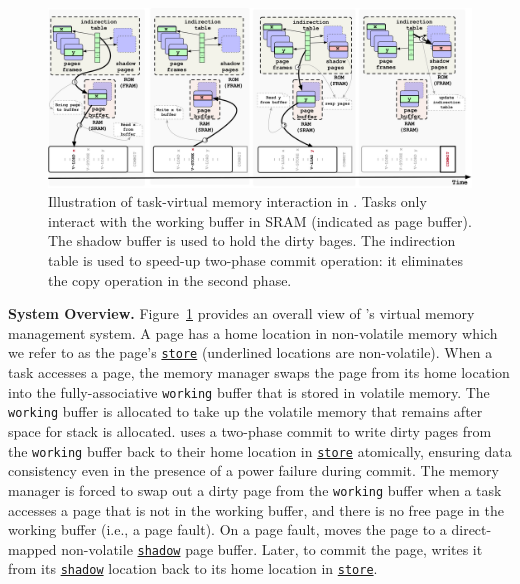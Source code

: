 \begin{figure}
	\centering
	\includegraphics[width=\columnwidth]{figures/graffle/paging.pdf}
	\caption{Illustration of task-virtual memory interaction in \sys. Tasks only interact with the working buffer in SRAM (indicated as page buffer). The shadow buffer is used to hold the dirty bages. The indirection table is used to speed-up two-phase commit operation: it eliminates the copy operation in the second phase.}
	\label{figure:coala_page_tags}
\end{figure}

\textbf{System Overview.} Figure~\ref{figure:coala_page_tags} provides an
overall view of \sys's virtual memory management system.  A page has a home
location in non-volatile memory which we refer to as the page's
\texttt{\underline{store}} (underlined locations are non-volatile).  When a
task accesses a page, the memory manager swaps the page from its home location
into the fully\hyp{}associative \texttt{working} buffer that is stored in
volatile memory.  The \texttt{working} buffer is allocated to take up the
volatile memory that remains after space for stack is allocated.
%
\sys uses a two-phase commit to write dirty pages from the \texttt{working}
buffer back to their home location in \texttt{\underline{store}} atomically,
ensuring data consistency even in the presence of a power failure during commit.
%
The memory manager is forced to swap out a dirty page from the \texttt{working} buffer 
when a task accesses a page that is not in the working buffer, and there is no
free page in the working buffer (i.e., a page fault). On a page fault, \sys
moves the page to a direct\hyp{}mapped non-volatile \texttt{\underline{shadow}}
page buffer. Later, to commit the page, \sys writes it from its
\texttt{\underline{shadow}} location back to its home location in
\texttt{\underline{store}}.
%
%

